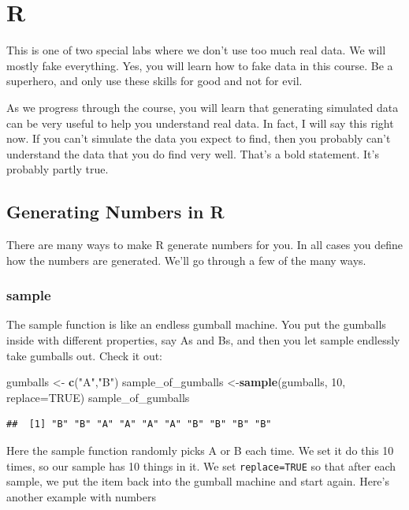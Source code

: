 \documentclass[]{book}
\newenvironment{Shaded}{\begin{snugshade}}{\end{snugshade}}
\newcommand{\KeywordTok}[1]{\textcolor[rgb]{0.13,0.29,0.53}{\textbf{#1}}}
\newcommand{\DataTypeTok}[1]{\textcolor[rgb]{0.13,0.29,0.53}{#1}}
\newcommand{\DecValTok}[1]{\textcolor[rgb]{0.00,0.00,0.81}{#1}}
\newcommand{\StringTok}[1]{\textcolor[rgb]{0.31,0.60,0.02}{#1}}
\newcommand{\OtherTok}[1]{\textcolor[rgb]{0.56,0.35,0.01}{#1}}
\newcommand{\NormalTok}[1]{#1}
\begin{document}
\section{R}\label{r-4}

This is one of two special labs where we don't use too much real data.
We will mostly fake everything. Yes, you will learn how to fake data in
this course. Be a superhero, and only use these skills for good and not
for evil.

As we progress through the course, you will learn that generating
simulated data can be very useful to help you understand real data. In
fact, I will say this right now. If you can't simulate the data you
expect to find, then you probably can't understand the data that you do
find very well. That's a bold statement. It's probably partly true.

\subsection{Generating Numbers in R}\label{generating-numbers-in-r}

There are many ways to make R generate numbers for you. In all cases you
define how the numbers are generated. We'll go through a few of the many
ways.

\subsubsection{sample}\label{sample}

The sample function is like an endless gumball machine. You put the
gumballs inside with different properties, say As and Bs, and then you
let sample endlessly take gumballs out. Check it out:

\begin{Shaded}
\begin{Highlighting}[]
\NormalTok{gumballs <-}\StringTok{ }\KeywordTok{c}\NormalTok{(}\StringTok{"A"}\NormalTok{,}\StringTok{"B"}\NormalTok{)}
\NormalTok{sample_of_gumballs <-}\KeywordTok{sample}\NormalTok{(gumballs, }\DecValTok{10}\NormalTok{, }\DataTypeTok{replace=}\OtherTok{TRUE}\NormalTok{)}
\NormalTok{sample_of_gumballs}
\end{Highlighting}
\end{Shaded}

\begin{verbatim}
##  [1] "B" "B" "A" "A" "A" "A" "B" "B" "B" "B"
\end{verbatim}

Here the sample function randomly picks A or B each time. We set it do
this 10 times, so our sample has 10 things in it. We set
\texttt{replace=TRUE} so that after each sample, we put the item back
into the gumball machine and start again. Here's another example with
numbers
\end{document}
